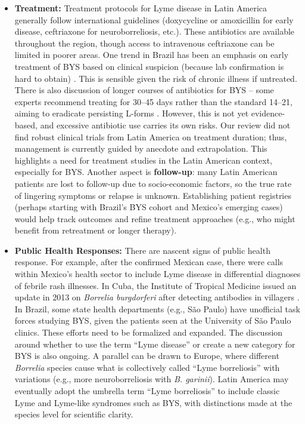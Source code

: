 \documentclass[11pt,letterpaper]{article}
\begin{document}
\begin{itemize}
    \item \textbf{Treatment:} Treatment protocols for Lyme disease in Latin America generally follow international guidelines (doxycycline or amoxicillin for early disease, ceftriaxone for neuroborreliosis, etc.). These antibiotics are available throughout the region, though access to intravenous ceftriaxone can be limited in poorer areas. One trend in Brazil has been an emphasis on early treatment of BYS based on clinical suspicion (because lab confirmation is hard to obtain) \citep{Yoshinari2022ag}. This is sensible given the risk of chronic illness if untreated. There is also discussion of longer courses of antibiotics for BYS – some experts recommend treating for 30–45 days rather than the standard 14–21, aiming to eradicate persisting L-forms \citep{Yoshinari2022ah, Yoshinari2022ai}. However, this is not yet evidence-based, and excessive antibiotic use carries its own risks. Our review did not find robust clinical trials from Latin America on treatment duration; thus, management is currently guided by anecdote and extrapolation. This highlights a need for treatment studies in the Latin American context, especially for BYS. Another aspect is \textbf{follow-up}: many Latin American patients are lost to follow-up due to socio-economic factors, so the true rate of lingering symptoms or relapse is unknown. Establishing patient registries (perhaps starting with Brazil’s BYS cohort and Mexico’s emerging cases) would help track outcomes and refine treatment approaches (e.g., who might benefit from retreatment or longer therapy).

    \item \textbf{Public Health Responses:} There are nascent signs of public health response. For example, after the confirmed Mexican case, there were calls within Mexico’s health sector to include Lyme disease in differential diagnoses of febrile rash illnesses. In Cuba, the Institute of Tropical Medicine issued an update in 2013 on \textit{Borrelia burgdorferi} after detecting antibodies in villagers \citep{Lucca2024w}. In Brazil, some state health departments (e.g., São Paulo) have unofficial task forces studying BYS, given the patients seen at the University of São Paulo clinics. These efforts need to be formalized and expanded. The discussion around whether to use the term “Lyme disease” or create a new category for BYS is also ongoing. A parallel can be drawn to Europe, where different \textit{Borrelia} species cause what is collectively called “Lyme borreliosis” with variations (e.g., more neuroborreliosis with \textit{B. garinii}). Latin America may eventually adopt the umbrella term “Lyme borreliosis” to include classic Lyme and Lyme-like syndromes such as BYS, with distinctions made at the species level for scientific clarity.


\end{itemize}
\end{document}
